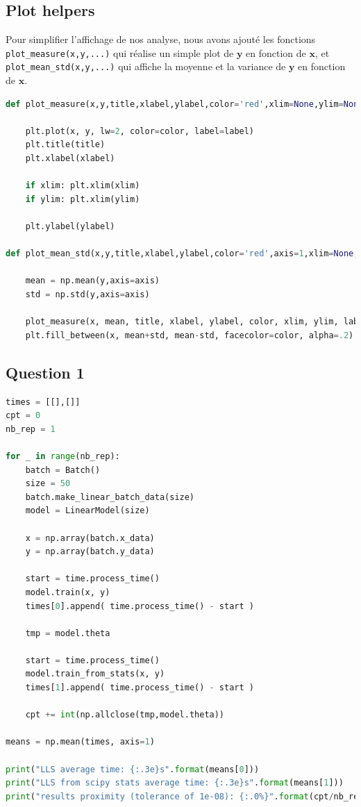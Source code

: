 \documentclass[french,12pt]{article}
\begin{document}
\subsection*{Plot helpers}

Pour simplifier l'affichage de nos analyse, nous avons ajouté les fonctions \lstinline{plot_measure(x,y,...)} qui réalise un simple plot de $\mathbf{y}$ en fonction de $\mathbf{x}$, et \lstinline{plot_mean_std(x,y,...)} qui affiche la moyenne et la variance de $\mathbf{y}$ en fonction de $\mathbf{x}$.
\bigskip

\begin{lstlisting}[language=Python]
def plot_measure(x,y,title,xlabel,ylabel,color='red',xlim=None,ylim=None,label=''):

    plt.plot(x, y, lw=2, color=color, label=label)
    plt.title(title)
    plt.xlabel(xlabel)

    if xlim: plt.xlim(xlim)
    if ylim: plt.xlim(ylim)

    plt.ylabel(ylabel)

def plot_mean_std(x,y,title,xlabel,ylabel,color='red',axis=1,xlim=None,ylim=None,label=''):

    mean = np.mean(y,axis=axis)
    std = np.std(y,axis=axis)

    plot_measure(x, mean, title, xlabel, ylabel, color, xlim, ylim, label)
    plt.fill_between(x, mean+std, mean-std, facecolor=color, alpha=.2)
\end{lstlisting}

\subsection*{Question 1}

\begin{lstlisting}[language=Python]
times = [[],[]]
cpt = 0
nb_rep = 1

for _ in range(nb_rep):
    batch = Batch()
    size = 50
    batch.make_linear_batch_data(size)
    model = LinearModel(size)

    x = np.array(batch.x_data)
    y = np.array(batch.y_data)

    start = time.process_time()
    model.train(x, y)
    times[0].append( time.process_time() - start )

    tmp = model.theta

    start = time.process_time()
    model.train_from_stats(x, y)
    times[1].append( time.process_time() - start )

    cpt += int(np.allclose(tmp,model.theta))

means = np.mean(times, axis=1)

print("LLS average time: {:.3e}s".format(means[0]))
print("LLS from scipy stats average time: {:.3e}s".format(means[1]))
print("results proximity (tolerance of 1e-08): {:.0%}".format(cpt/nb_rep))
\end{lstlisting}
\end{document}
